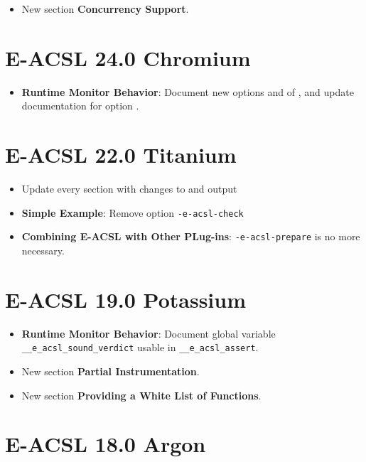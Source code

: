 \begin{itemize}
\item New section \textbf{Concurrency Support}.
\end{itemize}

\section*{E-ACSL 24.0 Chromium}

\begin{itemize}
\item \textbf{Runtime Monitor Behavior}: Document new options
   and  of
  \eacslgcc, and update documentation for option .
\end{itemize}

\section*{E-ACSL 22.0 Titanium}

\begin{itemize}
\item Update every section with changes to \framac and \eacslgcc output
\item \textbf{Simple Example}: Remove option \texttt{-e-acsl-check}
\item \textbf{Combining E-ACSL with Other PLug-ins}: \texttt{-e-acsl-prepare} is
  no more necessary.
\end{itemize}

\section*{E-ACSL 19.0 Potassium}

\begin{itemize}
\item \textbf{Runtime Monitor Behavior}: Document global variable
  \texttt{\_\_e\_acsl\_sound\_verdict} usable in \texttt{\_\_e\_acsl\_assert}.
\item New section \textbf{Partial Instrumentation}.
\item New section \textbf{Providing a White List of Functions}.
\end{itemize}

\section*{E-ACSL 18.0 Argon}

